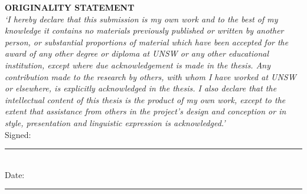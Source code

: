 \textbf{ORIGINALITY STATEMENT} \\

\textit{‘I hereby declare that this submission is my own work and to the best of my knowledge it contains no materials previously published or written by another person, or substantial proportions of material which have been accepted for the award of any other degree or diploma at UNSW or any other educational institution, except where due acknowledgement is made in the thesis. Any contribution made to the research by others, with whom I have worked at UNSW or elsewhere, is explicitly acknowledged in the thesis. I also declare that the intellectual content of this thesis is the product of my own work, except to the extent that assistance from others in the project's design and conception or in style, presentation and linguistic expression is acknowledged.’} \\

Signed:   \rule{5cm}{0.4pt} \\

Date: \hspace{0.1cm}     \rule{5cm}{0.4pt}
